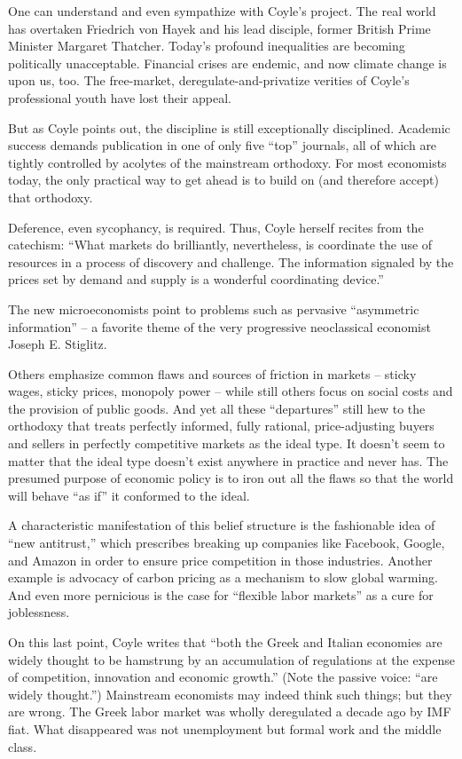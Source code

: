 \documentclass[
]{book}
\begin{document}
One can understand and even sympathize with Coyle's project. The real world has overtaken Friedrich von Hayek and his lead disciple, former British Prime Minister Margaret Thatcher. Today's profound inequalities are becoming politically unacceptable. Financial crises are endemic, and now climate change is upon us, too. The free-market, deregulate-and-privatize verities of Coyle's professional youth have lost their appeal.

But as Coyle points out, the discipline is still exceptionally disciplined. Academic success demands publication in one of only five ``top'' journals, all of which are tightly controlled by acolytes of the mainstream orthodoxy. For most economists today, the only practical way to get ahead is to build on (and therefore accept) that orthodoxy.

Deference, even sycophancy, is required. Thus, Coyle herself recites from the catechism: ``What markets do brilliantly, nevertheless, is coordinate the use of resources in a process of discovery and challenge. The information signaled by the prices set by demand and supply is a wonderful coordinating device.''

The new microeconomists point to problems such as pervasive ``asymmetric information'' -- a favorite theme of the very progressive neoclassical economist Joseph E. Stiglitz.

Others emphasize common flaws and sources of friction in markets -- sticky wages, sticky prices, monopoly power -- while still others focus on social costs and the provision of public goods. And yet all these ``departures'' still hew to the orthodoxy that treats perfectly informed, fully rational, price-adjusting buyers and sellers in perfectly competitive markets as the ideal type. It doesn't seem to matter that the ideal type doesn't exist anywhere in practice and never has. The presumed purpose of economic policy is to iron out all the flaws so that the world will behave ``as if'' it conformed to the ideal.

A characteristic manifestation of this belief structure is the fashionable idea of ``new antitrust,'' which prescribes breaking up companies like Facebook, Google, and Amazon in order to ensure price competition in those industries. Another example is advocacy of carbon pricing as a mechanism to slow global warming. And even more pernicious is the case for ``flexible labor markets'' as a cure for joblessness.

On this last point, Coyle writes that ``both the Greek and Italian economies are widely thought to be hamstrung by an accumulation of regulations at the expense of competition, innovation and economic growth.'' (Note the passive voice: ``are widely thought.'') Mainstream economists may indeed think such things; but they are wrong. The Greek labor market was wholly deregulated a decade ago by IMF fiat. What disappeared was not unemployment but formal work and the middle class.
\end{document}
